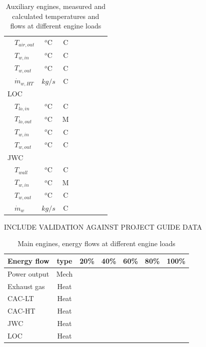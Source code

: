 \documentclass[preprint,12pt]{elsarticle}
\begin{document}
\begin{table}
\begin{tabular}{llccrrrrr}
		&	$T_{air,out}$   	& $^o$C & C  & & & & &  \\ 
		&	$T_{w,in}$    		& $^o$C & C  & & & & &  \\ 
		&	$T_{w,out}$   		& $^o$C & C  & & & & &  \\ 
		& 	$\dot{m}_{w,HT}$  	& $kg/s$ & C & & & & &  \\
		\multicolumn{2}{l}{LOC} & & & & & & &  \\
		&	$T_{lo,in}$   		& $^o$C & C  & & & & &  \\  
		&	$T_{lo,out}$    	& $^o$C & M  & & & & &  \\ 
		&	$T_{w,in}$    		& $^o$C & C  & & & & &  \\ 
		&	$T_{w,out}$   		& $^o$C & C  & & & & &  \\ 
		\multicolumn{2}{l}{JWC} & & & & & & &  \\
		&	$T_{wall}$    		& $^o$C & C  & & & & &  \\ 
		&	$T_{w,in}$    		& $^o$C & M  & & & & &  \\ 
		&	$T_{w,out}$	   		& $^o$C & C  & & & & &  \\ 
		& 	$\dot{m}_{w}$  		& $kg/s$ & C & & & & &  \\
		\hline
	\end{tabular}
	\caption{Auxiliary engines, measured and calculated temperatures and flows at different engine loads}
\end{table}

INCLUDE VALIDATION AGAINST PROJECT GUIDE DATA

\begin{table}
	\small
	\centering
	\begin{tabular}{lcrrrrr}
		\hline
		Energy flow & type & 20\% & 40\% & 60\% & 80\% & 100\% \\
		\hline
		Power output & Mech &  &  &  &  &  \\
		Exhaust gas & Heat &  &  &  &  &  \\
		CAC-LT & Heat &  &  &  &  &  \\
		CAC-HT & Heat &  &  &  &  &  \\
		JWC & Heat &  &  &  &  &  \\
		LOC & Heat &  &  &  &  &  \\
		\hline
	\end{tabular}
	\caption{Main engines, energy flows at different engine loads}
\end{table}
\end{document}
